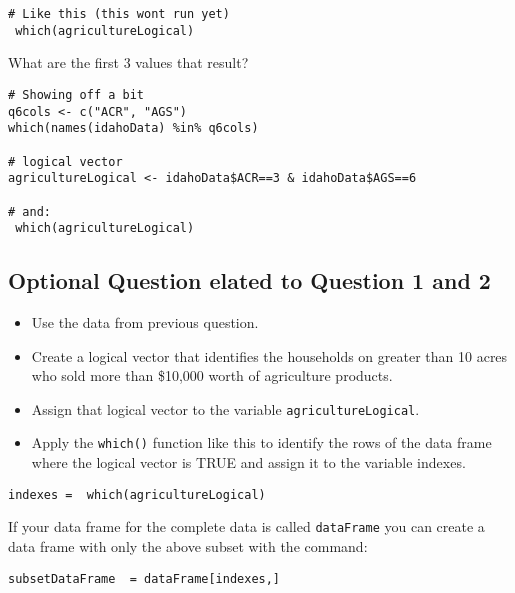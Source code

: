 \documentclass[]{article}
\begin{document}
\begin{framed}
\begin{framed} 
\begin{verbatim}
# Like this (this wont run yet)
 which(agricultureLogical) 
\end{verbatim}
\end{framed} 

What are the first 3 values that result?

\begin{framed} \begin{verbatim}
# Showing off a bit
q6cols <- c("ACR", "AGS")
which(names(idahoData) %in% q6cols)  

# logical vector
agricultureLogical <- idahoData$ACR==3 & idahoData$AGS==6

# and:
 which(agricultureLogical) 
\end{verbatim}\end{framed} 


\newpage
\subsection*{Optional Question elated to Question 1 and 2}

\begin{itemize}
\item Use the data from previous question. 
\item Create a logical vector that identifies the households on greater than 10 acres who
 sold more than \$10,000 worth of agriculture products. 
\item Assign that logical vector to the variable \texttt{agricultureLogical}. 
\item Apply the \texttt{which()} function like this to identify the rows of the 
data frame where the logical vector is TRUE and assign it to the variable indexes. 
\end{itemize}

\begin{framed} \begin{verbatim}
indexes =  which(agricultureLogical) 
\end{verbatim}\end{framed} 

If your data frame for the complete data is called \texttt{dataFrame} you can create a data frame 
with only the above subset with the command: 

\begin{framed} 
\begin{verbatim}
subsetDataFrame  = dataFrame[indexes,] 
\end{verbatim}
\end{framed} 


\end{framed}
\end{document}
